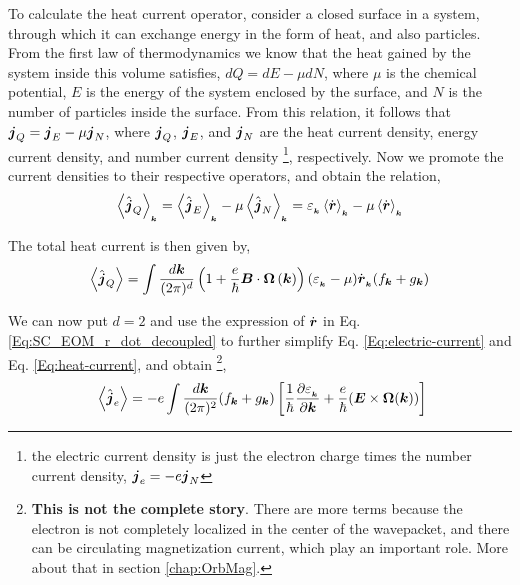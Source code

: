 \documentclass{report}
\renewcommand\vec[1]{\ensuremath\boldsymbol{#1}} %
\begin{document}
To calculate the heat current operator, consider a closed surface in a system, through which it can exchange energy in the form of heat, and also particles. From the first law of thermodynamics we know that the heat gained by the system inside this volume satisfies, $dQ = dE - \mu dN$, where $\mu$ is the chemical potential, $E$ is the energy of the system enclosed by the surface, and $N$ is the number of particles inside the surface. From this relation, it follows that $\vec{j}_Q = \vec{j}_E - \mu \vec{j}_N$, where $\vec{j}_Q$, $\vec{j}_E$, and $\vec{j}_N$ are the heat current density, energy current density, and number current density \footnote{the electric current density is just the electron charge times the number current density, $\vec{j}_e = -e \vec{j}_N$}, respectively. Now we promote the current densities to their respective operators, and obtain the relation,
\begin{equation} 
	\expval{\hat{\vec{j}}_Q}_{_{\vec{k}}} = \expval{\hat{\vec{j}}_E}_{_{\vec{k}}} - \mu \expval{\hat{\vec{j}}_N}_{_{\vec{k}}} = \varepsilon_{_{\vec{k}}} \expval{\dot{\vec{r}}}_{_{\vec{k}}} - \mu \expval{\dot{\vec{r}}}_{_{\vec{k}}}
\end{equation}

The total heat current is then given by,
\begin{equation} \label{Eq:heat-current}
	\expval{\hat{\vec{j}}_Q} = \int \frac{d\vec{k}}{(2\pi)^d} \left(1 + \frac{e}{\hbar} \vec{B} \cdot  \vec{\Omega}\left(\vec{k}\right)\right) (\varepsilon_{_{\vec{k}}} - \mu) \dot{\vec{r}}_{_{\vec{k}}} ({f}_{\vec{k}} + {g}_{\vec{k}})
\end{equation}

We can now put $d = 2$ and use the expression of $\dot{\vec{r}}$ in Eq. \eqref{Eq:SC_EOM_r_dot_decoupled} to further simplify Eq. \eqref{Eq:electric-current} and Eq. \eqref{Eq:heat-current}, and obtain \footnote{\textbf{This is not the complete story}. There are more terms because the electron is not completely localized in the center of the wavepacket, and there can be circulating magnetization current, which play an important role. More about that in section \ref{chap:OrbMag}.},
\begin{equation}~\label{Eq:electric-current-simplified}
	\expval{\hat{\vec{j}}_e} = -e \int \frac{d\vec{k}}{(2\pi)^2} ({f}_{\vec{k}} + {g}_{\vec{k}}) \left[\frac{1}{\hbar} \frac{\partial \varepsilon_{_{\vec{k}}}}{\partial \vec{k}} + \frac{e}{\hbar} (\vec{E}\times\vec{\Omega}(\vec{k}))\right]
\end{equation}
\end{document}
